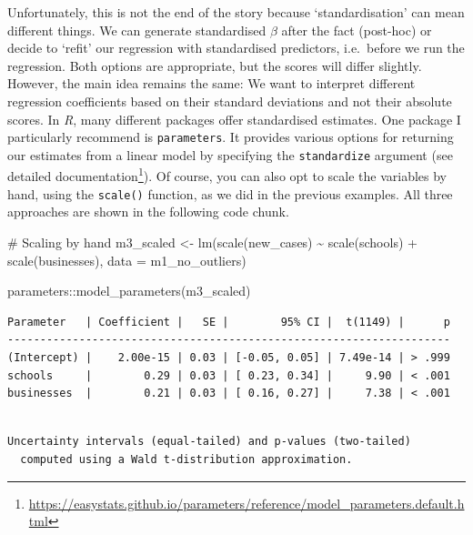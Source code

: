\documentclass[
  letterpaper,
]{krantz}
\makeatletter
\newenvironment{Shaded}{\begin{snugshade}}{\end{snugshade}}
\newcommand{\AttributeTok}[1]{\textcolor[rgb]{0.40,0.45,0.13}{#1}}
\newcommand{\CommentTok}[1]{\textcolor[rgb]{0.37,0.37,0.37}{#1}}
\newcommand{\FunctionTok}[1]{\textcolor[rgb]{0.28,0.35,0.67}{#1}}
\newcommand{\NormalTok}[1]{\textcolor[rgb]{0.00,0.23,0.31}{#1}}
\newcommand{\OtherTok}[1]{\textcolor[rgb]{0.00,0.23,0.31}{#1}}
\newcommand{\SpecialCharTok}[1]{\textcolor[rgb]{0.37,0.37,0.37}{#1}}
\renewcommand{\href}[2]{#2\footnote{\url{#1}}}
\newenvironment{kframe}{%
\medskip{}
\setlength{\fboxsep}{.8em}
 \def\at@end@of@kframe{}%
 \ifinner\ifhmode%
  \def\at@end@of@kframe{\end{minipage}}%
  \begin{minipage}{\columnwidth}%
 \fi\fi%
 \def\FrameCommand##1{\hskip\@totalleftmargin \hskip-\fboxsep
 \colorbox{shadecolor}{##1}\hskip-\fboxsep
     \hskip-\linewidth \hskip-\@totalleftmargin \hskip\columnwidth}%
 \MakeFramed {\advance\hsize-\width
   \@totalleftmargin\z@ \linewidth\hsize
   \@setminipage}}%
 {\par\unskip\endMakeFramed%
 \at@end@of@kframe}
\renewenvironment{Shaded}{\begin{kframe}}{\end{kframe}}
\makeatother
\begin{document}
Unfortunately, this is not the end of the story because
`standardisation' can mean different things. We can generate
standardised \(\beta\) after the fact (post-hoc) or decide to `refit'
our regression with standardised predictors, i.e.~before we run the
regression. Both options are appropriate, but the scores will differ
slightly. However, the main idea remains the same: We want to interpret
different regression coefficients based on their standard deviations and
not their absolute scores. In \emph{R}, many different packages offer
standardised estimates. One package I particularly recommend is
\texttt{parameters}. It provides various options for returning our
estimates from a linear model by specifying the \texttt{standardize}
argument (see
\href{https://easystats.github.io/parameters/reference/model_parameters.default.html}{detailed
documentation}). Of course, you can also opt to scale the variables by
hand, using the \texttt{scale()} function, as we did in the previous
examples. All three approaches are shown in the following code chunk.

\begin{Shaded}
\begin{Highlighting}[]
\CommentTok{\# Scaling \textquotesingle{}by hand\textquotesingle{}}
\NormalTok{m3\_scaled }\OtherTok{\textless{}{-}} \FunctionTok{lm}\NormalTok{(}\FunctionTok{scale}\NormalTok{(new\_cases) }\SpecialCharTok{\textasciitilde{}}
                  \FunctionTok{scale}\NormalTok{(schools) }\SpecialCharTok{+}
                  \FunctionTok{scale}\NormalTok{(businesses),}
                \AttributeTok{data =}\NormalTok{ m1\_no\_outliers)}

\NormalTok{parameters}\SpecialCharTok{::}\FunctionTok{model\_parameters}\NormalTok{(m3\_scaled)}
\end{Highlighting}
\end{Shaded}

\begin{verbatim}
Parameter   | Coefficient |   SE |        95% CI |  t(1149) |      p
--------------------------------------------------------------------
(Intercept) |    2.00e-15 | 0.03 | [-0.05, 0.05] | 7.49e-14 | > .999
schools     |        0.29 | 0.03 | [ 0.23, 0.34] |     9.90 | < .001
businesses  |        0.21 | 0.03 | [ 0.16, 0.27] |     7.38 | < .001
\end{verbatim}

\begin{verbatim}

Uncertainty intervals (equal-tailed) and p-values (two-tailed)
  computed using a Wald t-distribution approximation.
\end{verbatim}
\end{document}
